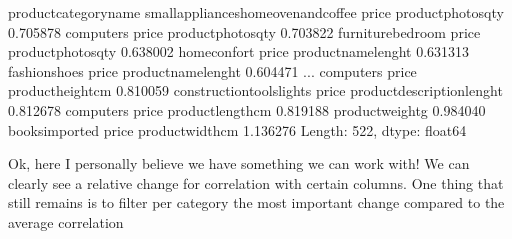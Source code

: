 \documentclass[letterpaper,10pt,english]{jupyterBook}
\begin{document}
\begin{sphinxVerbatim}[commandchars=\\\{\}]
product\PYGZus{}category\PYGZus{}name                                                   
small\PYGZus{}appliances\PYGZus{}home\PYGZus{}oven\PYGZus{}and\PYGZus{}coffee  price  product\PYGZus{}photos\PYGZus{}qty            0.705878
computers                              price  product\PYGZus{}photos\PYGZus{}qty            0.703822
furniture\PYGZus{}bedroom                      price  product\PYGZus{}photos\PYGZus{}qty            0.638002
home\PYGZus{}confort                           price  product\PYGZus{}name\PYGZus{}lenght           0.631313
fashion\PYGZus{}shoes                          price  product\PYGZus{}name\PYGZus{}lenght           0.604471
                                                                              ...   
computers                              price  product\PYGZus{}height\PYGZus{}cm            \PYGZhy{}0.810059
construction\PYGZus{}tools\PYGZus{}lights              price  product\PYGZus{}description\PYGZus{}lenght   \PYGZhy{}0.812678
computers                              price  product\PYGZus{}length\PYGZus{}cm            \PYGZhy{}0.819188
                                              product\PYGZus{}weight\PYGZus{}g             \PYGZhy{}0.984040
books\PYGZus{}imported                         price  product\PYGZus{}width\PYGZus{}cm             \PYGZhy{}1.136276
Length: 522, dtype: float64
\end{sphinxVerbatim}

\sphinxAtStartPar
Ok, here I personally believe we have something we can work with! We can clearly see a relative change for correlation with certain columns. One thing that still remains is to filter per category the most important change compared to the average correlation
\end{document}
